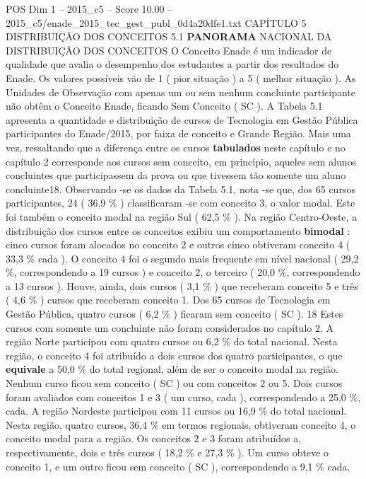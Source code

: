 \begin{textsample}{POS Dim 1 – 2015\_c5 – Score 10.00 – 2015\_c5/enade\_2015\_tec\_gest\_publ\_0d4a20dfe1.txt}  \label{ex:f1_pos_095}
CAPÍTULO 5 DISTRIBUIÇÃO DOS CONCEITOS 5.1 \textbf{PANORAMA} NACIONAL DA DISTRIBUIÇÃO DOS CONCEITOS O Conceito Enade é um indicador de qualidade que avalia o desempenho dos estudantes a partir dos resultados do Enade.
Os valores possíveis vão de 1 ( pior situação ) a 5 ( melhor situação ).
As Unidades de Observação com apenas um ou sem nenhum concluinte participante não obtêm o Conceito Enade, ficando Sem Conceito ( SC ).
A Tabela 5.1 apresenta a quantidade e distribuição de cursos de Tecnologia em Gestão Pública participantes do Enade/2015, por faixa de conceito e Grande Região.
Mais uma vez, ressaltando que a diferença entre os cursos \textbf{tabulados} neste capítulo e no capítulo 2 corresponde aos cursos sem conceito, em princípio, aqueles sem alunos concluintes que participassem da prova ou que tivessem tão somente um aluno concluinte18.
Observando -se os dados da Tabela 5.1, nota -se que, dos 65 cursos participantes, 24 ( 36,9 \% ) classificaram -se com conceito 3, o valor modal.
Este foi também o conceito modal na região Sul ( 62,5 \% ).
Na região Centro-Oeste, a distribuição dos cursos entre os conceitos exibiu um comportamento \textbf{bimodal} : cinco cursos foram alocados no conceito 2 e outros cinco obtiveram conceito 4 ( 33,3 \% cada ).
O conceito 4 foi o segundo mais frequente em nível nacional ( 29,2 \%, correspondendo a 19 cursos ) e conceito 2, o terceiro ( 20,0 \%, correspondendo a 13 cursos ).
Houve, ainda, dois cursos ( 3,1 \% ) que receberam conceito 5 e três ( 4,6 \% ) cursos que receberam conceito 1.
Dos 65 cursos de Tecnologia em Gestão Pública, quatro cursos ( 6,2 \% ) ficaram sem conceito ( SC ). 18 Estes cursos com somente um concluinte não foram considerados no capítulo 2.
A região Norte participou com quatro cursos ou 6,2 \% do total nacional.
Nesta região, o conceito 4 foi atribuído a dois cursos dos quatro participantes, o que \textbf{equivale} a 50,0 \% do total regional, além de ser o conceito modal na região.
Nenhum curso ficou sem conceito ( SC ) ou com conceitos 2 ou 5.
Dois cursos foram avaliados com conceitos 1 e 3 ( um curso, cada ), correspondendo a 25,0 \%, cada.
A região Nordeste participou com 11 cursos ou 16,9 \% do total nacional.
Nesta região, quatro cursos, 36,4 \% em termos regionais, obtiveram conceito 4, o conceito modal para a região.
Os conceitos 2 e 3 foram atribuídos a, respectivamente, dois e três cursos ( 18,2 \% e 27,3 \% ).
Um curso obteve o conceito 1, e um outro ficou sem conceito ( SC ), correspondendo a 9,1 \% cada.

\end{textsample}
